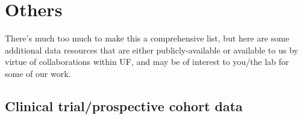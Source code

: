 \documentclass[
  letterpaper,
  DIV=11,
  numbers=noendperiod]{scrreprt}
\begin{document}
\hypertarget{others}{%
\section{Others}\label{others}}

There's much too much to make this a comprehensive list, but here are
some additional data resources that are either publicly-available or
available to us by virtue of collaborations within UF, and may be of
interest to you/the lab for some of our work.

\hypertarget{clinical-trialprospective-cohort-data}{%
\subsection{Clinical trial/prospective cohort
data}\label{clinical-trialprospective-cohort-data}}
\end{document}
